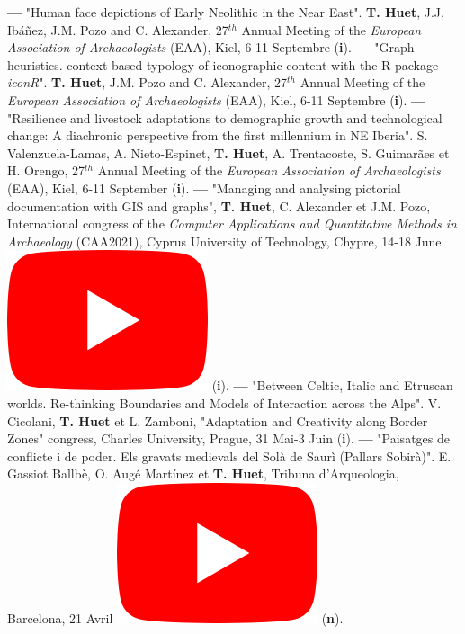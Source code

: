 \documentclass{article}
\begin{document}
\smallbreak
\textbf{--- }"Human face depictions of Early Neolithic in the Near East". \textbf{T. Huet}, J.J. Ibáñez, J.M. Pozo and C. Alexander, 27${}^{th}$ Annual Meeting of the \textit{European Association of Archaeologists} (EAA), Kiel, 6-11 Septembre (\textbf{i}).
\smallbreak
\textbf{--- }"Graph heuristics. context-based typology of iconographic content with the R package \textit{iconR}". \textbf{T. Huet}, J.M. Pozo and C. Alexander, 27${}^{th}$ Annual Meeting of the \textit{European Association of Archaeologists} (EAA), Kiel, 6-11 Septembre (\textbf{i}).
\smallbreak
\textbf{--- }"Resilience and livestock adaptations to demographic growth and technological change: A diachronic perspective from the first millennium in NE Iberia". S. Valenzuela-Lamas, A. Nieto-Espinet, \textbf{T. Huet}, A. Trentacoste, S. Guimarães et H. Orengo, 27${}^{th}$ Annual Meeting of the \textit{European Association of Archaeologists} (EAA), Kiel, 6-11 September (\textbf{i}).
\smallbreak
\textbf{--- }"Managing and analysing pictorial documentation with GIS and graphs", \textbf{T. Huet}, C. Alexander et J.M. Pozo, International congress of the \textit{Computer Applications and Quantitative Methods in Archaeology} (CAA2021), Cyprus University of Technology, Chypre, 14-18 June \href{https://youtu.be/tUhHhzGSgbk?t=4950}{\includegraphics[scale=0.2]{icon_youtube}} (\textbf{i}).
\smallbreak
\textbf{--- }"Between Celtic, Italic and Etruscan worlds. Re-thinking Boundaries and Models of Interaction across the Alps". V. Cicolani, \textbf{T. Huet} et L. Zamboni, "Adaptation and Creativity along Border Zones" congress, Charles University, Prague, 31 Mai-3 Juin (\textbf{i}).
\smallbreak
\textbf{--- }"Paisatges de conflicte i de poder. Els gravats medievals del Sol\`{a} de Saur\`{i} (Pallars Sobir\`{a})". E. Gassiot Ballb\`{e}, O. Aug\'{e} Mart\'{i}nez et \textbf{T. Huet}, Tribuna d'Arqueologia, Barcelona, 21 Avril \href{https://www.youtube.com/watch?v=4b7gLw4NV_E}{\includegraphics[scale=0.2]{icon_youtube}} (\textbf{n}).
\end{document}
